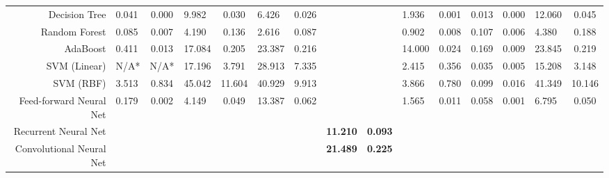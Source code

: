 \documentclass[letterpaper]{article}
\begin{document}
\begin{landscape}
\begin{table}[t!]
\begin{tabular}{@{}r|lclclclclclclc@{}}
			\hline
			Decision Tree             & 0.041                     & 0.000 & 9.982                     & 0.030 & 6.426                     & 0.026 &                           &         & 1.936                         & 0.001   & 0.013                        & 0.000   & 12.060                       & 0.045         \\
			Random Forest             & 0.085                     & 0.007 & 4.190                     & 0.136 & 2.616                     & 0.087 &                           &         & 0.902                         & 0.008   & 0.107                        & 0.006   & 4.380                        & 0.188         \\
			AdaBoost                  & 0.411                     & 0.013 & 17.084                    & 0.205 & 23.387                    & 0.216 &                           &         & 14.000                        & 0.024   & 0.169                        & 0.009   & 23.845                       & 0.219         \\
			SVM (Linear)              & N/A*                      &  N/A*      & 17.196                    & 3.791 & 28.913                    & 7.335 &                           &         & 2.415                         & 0.356   & 0.035                        & 0.005   & 15.208                       & 3.148         \\
			SVM (RBF)                 & 3.513                     & 0.834 & 45.042                    & 11.604& 40.929                    & 9.913 &                           &         & 3.866                         & 0.780   & 0.099                        & 0.016   & 41.349                       & 10.146        \\
			\hline
			Feed-forward Neural Net   & 0.179                     & 0.002 & 4.149                     & 0.049 & 13.387                    & 0.062 &                           &         & 1.565                         & 0.011   & 0.058                        & 0.001   & 6.795                        & 0.050         \\
			Recurrent Neural Net      &                           &       &                           &       &                           &       & \textbf{11.210}                    & \textbf{0.093}   &                               &         &                              &         &                              &               \\
			Convolutional Neural Net  &                           &       &                           &       &                           &       & \textbf{21.489}                    & \textbf{0.225}   &                               &         &                              &         &                              &               \\ \bottomrule
		\end{tabular}
	\end{table}
\end{landscape}

\clearpage

% 
% 


\end{document}
